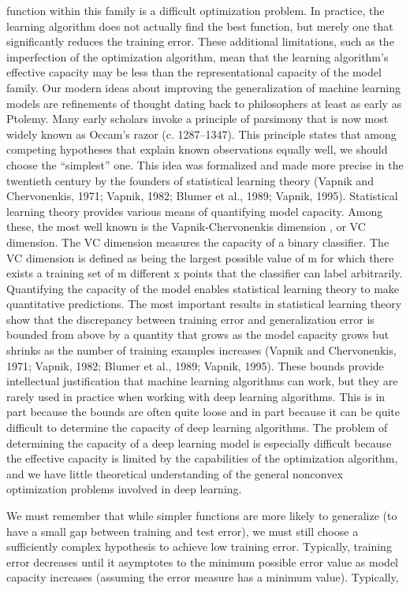 \documentclass[11pt]{article}
\begin{document}
function within this family is a diﬃcult optimization problem. In practice, the
learning algorithm does not actually ﬁnd the best function, but merely one that
signiﬁcantly reduces the training error. These additional limitations, such as the
imperfection of the optimization algorithm, mean that the learning algorithm’s
eﬀective capacity
may be less than the representational capacity of the model
family.
Our modern ideas about improving the generalization of machine learning
models are reﬁnements of thought dating back to philosophers at least as early as
Ptolemy. Many early scholars invoke a principle of parsimony that is now most
widely known as
Occam’s razor
(c. 1287–1347). This principle states that among
competing hypotheses that explain known observations equally well, we should
choose the “simplest” one. This idea was formalized and made more precise in
the twentieth century by the founders of statistical learning theory (Vapnik and
Chervonenkis, 1971; Vapnik, 1982; Blumer et al., 1989; Vapnik, 1995).
Statistical learning theory provides various means of quantifying model capacity.
Among these, the most well known is the
Vapnik-Chervonenkis dimension
, or
VC dimension. The VC dimension measures the capacity of a binary classiﬁer. The
VC dimension is deﬁned as being the largest possible value of
m
for which there
exists a training set of
m
diﬀerent
x
points that the classiﬁer can label arbitrarily.
Quantifying the capacity of the model enables statistical learning theory to
make quantitative predictions. The most important results in statistical learning
theory show that the discrepancy between training error and generalization error
is bounded from above by a quantity that grows as the model capacity grows but
shrinks as the number of training examples increases (Vapnik and Chervonenkis,
1971; Vapnik, 1982; Blumer et al., 1989; Vapnik, 1995). These bounds provide
intellectual justiﬁcation that machine learning algorithms can work, but they are
rarely used in practice when working with deep learning algorithms. This is in
part because the bounds are often quite loose and in part because it can be quite
diﬃcult to determine the capacity of deep learning algorithms. The problem of
determining the capacity of a deep learning model is especially diﬃcult because
the eﬀective capacity is limited by the capabilities of the optimization algorithm,
and we have little theoretical understanding of the general nonconvex optimization
problems involved in deep learning.

We must remember that while simpler functions are more likely to generalize
(to have a small gap between training and test error), we must still choose a
suﬃciently complex hypothesis to achieve low training error. Typically, training
error decreases until it asymptotes to the minimum possible error value as model
capacity increases (assuming the error measure has a minimum value). Typically,
\end{document}
